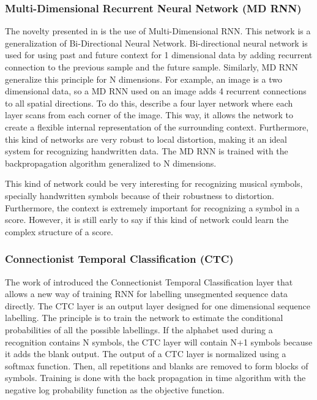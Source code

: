 \documentclass[11pt]{sdm}
\begin{document}
\subsubsection{Multi-Dimensional Recurrent Neural Network (MD RNN)}

The novelty presented in \cite{graves_offline_2009} is the use of Multi-Dimensional RNN.
This network is a generalization of Bi-Directional Neural Network.
Bi-directional neural network is used for using past and future context for 1 dimensional data by adding recurrent connection to the previous sample and the future sample.
Similarly, MD RNN generalize this principle for N dimensions.
For example, an image is a two dimensional data, so a MD RNN used on an image adds 4 recurrent connections to all spatial directions.
To do this, \cite{graves_offline_2009} describe a four layer network where each layer scans from each corner of the image.
This way, it allows the network to create a flexible internal representation of the surrounding context.
Furthermore, this kind of networks are very robust to local distortion, making it an ideal system for recognizing handwritten data.
The MD RNN is trained with the backpropagation algorithm generalized to N dimensions.

This kind of network could be very interesting for recognizing musical symbols, specially handwritten symbols because of their robustness to distortion.
Furthermore, the context is extremely important for recognizing a symbol in a score.
However, it is still early to say if this kind of network could learn the complex structure of a score.

\subsubsection{Connectionist Temporal Classification (CTC)}

The work of \cite{graves_connectionist_2006} introduced the Connectionist Temporal Classification layer that allows a new way of training RNN for labelling unsegmented sequence data directly.
The CTC layer is an output layer designed for one dimensional sequence labelling.
The principle is to train the network to estimate the conditional probabilities of all the possible labellings.
If the alphabet used during a recognition contains N symbols, the CTC layer will contain N+1 symbols because it adds the blank output.
The output of a CTC layer is normalized using a softmax function.
Then, all repetitions and blanks are removed to form blocks of symbols.
Training is done with the back propagation in time algorithm with the negative log probability function as the objective function.
\end{document}
